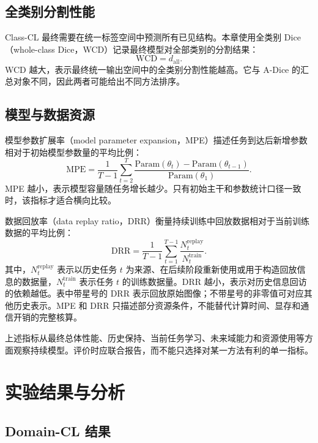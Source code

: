 \subsection*{全类别分割性能}

Class-CL 最终需要在统一标签空间中预测所有已见结构。本章使用全类别 Dice（whole-class Dice，WCD）记录最终模型对全部类别的分割结果：
\begin{equation}
\mathrm{WCD}=d_{\mathrm{all}}.
\label{eq:benchmark-wcd}
\end{equation}
WCD 越大，表示最终统一输出空间中的全类别分割性能越高。它与 A-Dice 的汇总对象不同，因此两者可能给出不同方法排序。

\subsection*{模型与数据资源}

模型参数扩展率（model parameter expansion，MPE）描述任务到达后新增参数相对于初始模型参数量的平均比例：
\begin{equation}
\mathrm{MPE}
=
\frac{1}{T-1}
\sum_{t=2}^{T}
\frac{
\mathrm{Param}(\theta_t)-\mathrm{Param}(\theta_{t-1})
}{
\mathrm{Param}(\theta_1)
}.
\label{eq:benchmark-mpe}
\end{equation}
MPE 越小，表示模型容量随任务增长越少。只有初始主干和参数统计口径一致时，该指标才适合横向比较。

数据回放率（data replay ratio，DRR）衡量持续训练中回放数据相对于当前训练数据的平均比例：
\begin{equation}
\mathrm{DRR}
=
\frac{1}{T-1}
\sum_{t=1}^{T-1}
\frac{
N_t^{\mathrm{replay}}
}{
N_t^{\mathrm{train}}
}.
\label{eq:benchmark-drr}
\end{equation}
其中，$N_t^{\mathrm{replay}}$ 表示以历史任务 $t$ 为来源、在后续阶段重新使用或用于构造回放信息的数据量，$N_t^{\mathrm{train}}$ 表示任务 $t$ 的训练数据量。DRR 越小，表示对历史信息回访的依赖越低。表中带星号的 DRR 表示回放原始图像；不带星号的非零值可对应其他历史表示。MPE 和 DRR 只描述部分资源条件，不能替代计算时间、显存和通信开销的完整核算。

上述指标从最终总体性能、历史保持、当前任务学习、未来域能力和资源使用等方面观察持续模型。评价时应联合报告，而不能只选择对某一方法有利的单一指标。


\section{实验结果与分析}
\label{sec:benchmark-results}

\subsection*{Domain-CL 结果}

